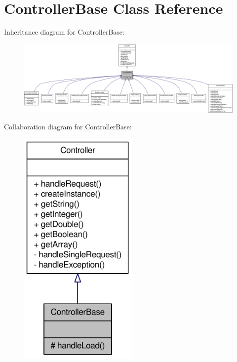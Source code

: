 \hypertarget{classControllerBase}{
\section{ControllerBase Class Reference}
\label{classControllerBase}
}


Inheritance diagram for ControllerBase:\nopagebreak
\begin{figure}[H]
\begin{center}
\leavevmode
\includegraphics[width=400pt]{classControllerBase__inherit__graph}
\end{center}
\end{figure}


Collaboration diagram for ControllerBase:\nopagebreak
\begin{figure}[H]
\begin{center}
\leavevmode
\includegraphics[width=164pt]{classControllerBase__coll__graph}
\end{center}
\end{figure}
